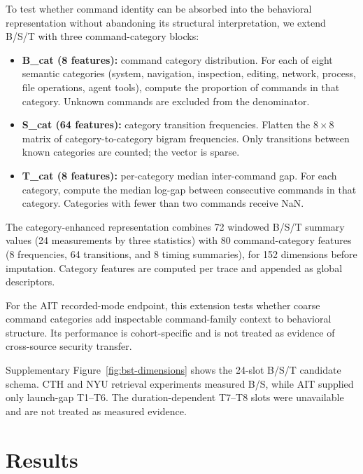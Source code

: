 \documentclass[10pt]{article}
\begin{document}
To test whether command identity can be absorbed into the behavioral representation without abandoning its structural interpretation, we extend B/S/T with three command-category blocks:

\begin{itemize}
\item \textbf{B\_cat (8 features):} command category distribution. For each of eight semantic categories (system, navigation, inspection, editing, network, process, file operations, agent tools), compute the proportion of commands in that category. Unknown commands are excluded from the denominator.
\item \textbf{S\_cat (64 features):} category transition frequencies. Flatten the $8\times 8$ matrix of category-to-category bigram frequencies. Only transitions between known categories are counted; the vector is sparse.
\item \textbf{T\_cat (8 features):} per-category median inter-command gap. For each category, compute the median log-gap between consecutive commands in that category. Categories with fewer than two commands receive NaN.
\end{itemize}


The category-enhanced representation combines 72 windowed B/S/T summary values (24 measurements by three statistics) with 80 command-category features (8 frequencies, 64 transitions, and 8 timing summaries), for 152 dimensions before imputation. Category features are computed per trace and appended as global descriptors.

For the AIT recorded-mode endpoint, this extension tests whether coarse command categories add inspectable command-family context to behavioral structure. Its performance is cohort-specific and is not treated as evidence of cross-source security transfer.

Supplementary Figure~\ref{fig:bst-dimensions} shows the 24-slot B/S/T candidate schema. CTH and NYU retrieval experiments measured B/S, while AIT supplied only launch-gap T1--T6. The duration-dependent T7--T8 slots were unavailable and are not treated as measured evidence.

\section{Results}
\end{document}
